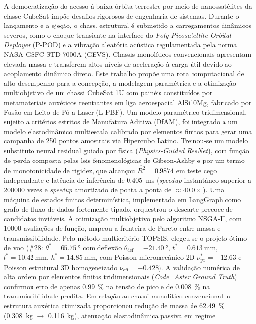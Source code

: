 
\begin{center}
\ABNTEXchapterfont\bfseries\Large\imprimirtitulo
\end{center}

\begin{resumo}
A democratização do acesso à baixa órbita terrestre por meio de nanossatélites da classe CubeSat impõe desafios rigorosos de engenharia de sistemas. Durante o lançamento e a ejeção, o chassi estrutural é submetido a carregamentos dinâmicos severos, como o choque transiente na interface do \textit{Poly-Picosatellite Orbital Deployer} (P-POD) e a vibração aleatória acústica regulamentada pela norma NASA GSFC-STD-7000A (GEVS). Chassis monolíticos convencionais apresentam elevada massa e transferem altos níveis de aceleração à carga útil devido ao acoplamento dinâmico direto. Este trabalho propõe uma rota computacional de alto desempenho para a concepção, a modelagem paramétrica e a otimização multiobjetivo de um chassi CubeSat 1U com painéis constituídos por metamateriais auxéticos reentrantes em liga aeroespacial AlSi10Mg, fabricado por Fusão em Leito de Pó a Laser (L-PBF). Um modelo paramétrico tridimensional, sujeito a critérios estritos de Manufatura Aditiva (DfAM), foi integrado a um modelo elastodinâmico multiescala calibrado por elementos finitos para gerar uma campanha de 250 pontos amostrais via Hipercubo Latino. Treinou-se um modelo substituto neural residual guiado por física (\textit{Physics-Guided ResNet}), com função de perda composta pelas leis fenomenológicas de Gibson-Ashby e por um termo de monotonicidade de rigidez, que alcançou $\overline{R^2} = \num{0.9874}$ em teste cego independente e latência de inferência de \SI{0.405}{\milli\second} (\textit{speedup} instantâneo superior a \num{200000} vezes e \textit{speedup} amortizado de ponta a ponta de $\approx \num{40.0}\times$). Uma máquina de estados finitos determinística, implementada em LangGraph como grafo de fluxo de dados fortemente tipado, orquestrou o descarte precoce de candidatos inviáveis. A otimização multiobjetivo pelo algoritmo NSGA-II, com \num{10000} avaliações de função, mapeou a fronteira de Pareto entre massa e transmissibilidade. Pelo método multicritério TOPSIS, elegeu-se o projeto ótimo de voo (\#28: $\theta^* = \SI{65.75}{\degree}$ com deflexão $\theta_{\text{def}} = \SI{-21.40}{\degree}$, $t^* = \SI{0.613}{\milli\metre}$, $l^* = \SI{10.42}{\milli\metre}$, $h^* = \SI{14.85}{\milli\metre}$, com Poisson micromecânico 2D $\nu_{yx}^* = \num{-12.63}$ e Poisson estrutural 3D homogeneizado $\nu_{\text{eff}} = \num{-0.428}$). A validação numérica de alta ordem por elementos finitos tridimensionais (\textit{Code\_Aster Ground Truth}) confirmou erro de apenas \SI{0.99}{\percent} na tensão de pico e de \SI{0.008}{\percent} na transmissibilidade predita. Em relação ao chassi monolítico convencional, a estrutura auxética otimizada proporcionou redução de massa de \SI{62.49}{\percent} (\SI{0.308}{\kilo\gram} $\to$ \SI{0.116}{\kilo\gram}), atenuação elastodinâmica passiva em regime 
\end{resumo}
